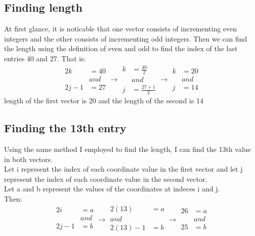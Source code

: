 \documentclass{article}
\begin{document}
\subsection{Finding length}
At first glance, it is noticable that one vector consists of incrementing even
integers and the other consists of incrementing odd integers. Then we can find
the length using the definition of even and odd to find the index of the last
entries 40 and 27.
That is:\\
\begin{equation*}
\begin{split}
2k &= 40\\
&and\\
2j-1 &= 27
\end{split}
\xrightarrow{}
\begin{split}
k &= \frac{40}{2}\\
&and\\
j &= \frac{27+1}{2}
\end{split}
\xrightarrow{}
\begin{split}
k &= 20\\
&and\\
j &= 14
\end{split}
\end{equation*}
length of the first vector is 20 and the length of the second is 14
\subsection{Finding the 13th entry}
Using the same method I employed to find the length, I can find the 13th value
in both vectors.\\
Let i represent the index of each coordinate value in the first vector and let j
represent the index of each coordinate value in the second vector.\\
Let a and b represent the values of the coordinates at indeces i and j.\\
Then:\\
\begin{equation*}
\begin{split}
2i &= a\\
&and\\
2j-1 &= b\\
\end{split}
\xrightarrow{}
\begin{split}
2(13) &= a\\
and\\
2(13)-1 &= b\\
\end{split}
\xrightarrow{}
\begin{split}
26 &= a\\
&and\\
25 &= b\\
\end{split}
\end{equation*}
\end{document}
